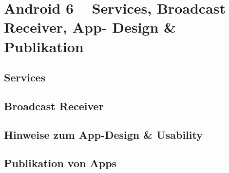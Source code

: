 \chapter{Android 6 – Services, Broadcast Receiver, App- Design \& Publikation}

\section{Services}

\section{Broadcast Receiver}

\section{Hinweise zum App-Design \& Usability}

\section{Publikation von Apps}